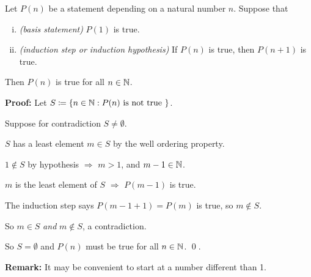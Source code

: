 \documentclass[10pt,aspectratio=169]{beamer}
\begin{document}
\begin{frame}
\begin{theorem}
Let $P(n)$ be a statement depending on a natural number $n$.
\pause
Suppose that
\begin{enumerate}[(i)]
\item \emph{(basis statement)} $P(1)$ is true.
\pause
\item \emph{(induction step or induction hypothesis)} If $P(n)$ is true, then $P(n+1)$ is true.
\end{enumerate}
\pause
Then $P(n)$ is true for all $n \in {\mathbb{N}}$.
\end{theorem}
\pause

\textbf{Proof:}
Let $S \coloneqq \{ n \in {\mathbb{N}} : P(n) \text{ is not true } \}$.

\medskip
\pause

Suppose for contradiction $S \not= \emptyset$.

\medskip
\pause

$S$ has a least element $m \in S$ by the well ordering property.

\medskip
\pause

$1 \notin S$ by hypothesis \quad $\Rightarrow$ \quad
$m > 1$, and $m-1 \in {\mathbb{N}}$.

\medskip
\pause

$m$ is the least element of $S$ \quad $\Rightarrow$ \quad $P(m-1)$ is true.

\medskip
\pause

The induction step says $P(m-1+1) = P(m)$ is true, so $m \notin S$.

\medskip
\pause

So $m \in S$ \emph{and} $m \notin S$, a contradiction.

\medskip
\pause

So $S = \emptyset$ and $P(n)$ must be true for all $n \in {\mathbb{N}}$.
\qed.

\medskip
\pause

\textbf{Remark:} It may be convenient to start at a number different than 1.
\end{frame}
\end{document}
